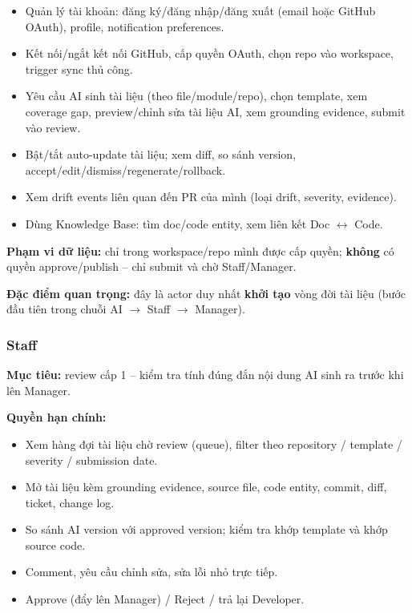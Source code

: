 \begin{itemize}
    \item Quản lý tài khoản: đăng ký/đăng nhập/đăng xuất
    (email hoặc GitHub OAuth), profile, notification preferences.

    \item Kết nối/ngắt kết nối GitHub, cấp quyền OAuth, chọn repo vào
    workspace, trigger sync thủ công.

    \item Yêu cầu AI sinh tài liệu (theo file/module/repo), chọn template,
    xem coverage gap, preview/chỉnh sửa tài liệu AI, xem grounding evidence,
    submit vào review.

    \item Bật/tắt auto-update tài liệu; xem diff, so sánh version,
    accept/edit/dismiss/regenerate/rollback.

    \item Xem drift events liên quan đến PR của mình
    (loại drift, severity, evidence).

    \item Dùng Knowledge Base: tìm doc/code entity, xem liên kết
    Doc $\leftrightarrow$ Code.
\end{itemize}

\textbf{Phạm vi dữ liệu:} chỉ trong workspace/repo mình được cấp quyền;
\textbf{không} có quyền approve/publish -- chỉ submit và chờ Staff/Manager.

\textbf{Đặc điểm quan trọng:} đây là actor duy nhất
\textbf{khởi tạo} vòng đời tài liệu (bước đầu tiên trong chuỗi
AI $\rightarrow$ Staff $\rightarrow$ Manager).


\subsubsection{Staff}

\textbf{Mục tiêu:} review cấp 1 -- kiểm tra tính đúng đắn nội dung AI
sinh ra trước khi lên Manager.

\textbf{Quyền hạn chính:}

\begin{itemize}
    \item Xem hàng đợi tài liệu chờ review (queue), filter theo
    repository / template / severity / submission date.

    \item Mở tài liệu kèm grounding evidence, source file, code entity,
    commit, diff, ticket, change log.

    \item So sánh AI version với approved version; kiểm tra khớp template
    và khớp source code.

    \item Comment, yêu cầu chỉnh sửa, sửa lỗi nhỏ trực tiếp.

    \item Approve (đẩy lên Manager) / Reject / trả lại Developer.
\end{itemize}

